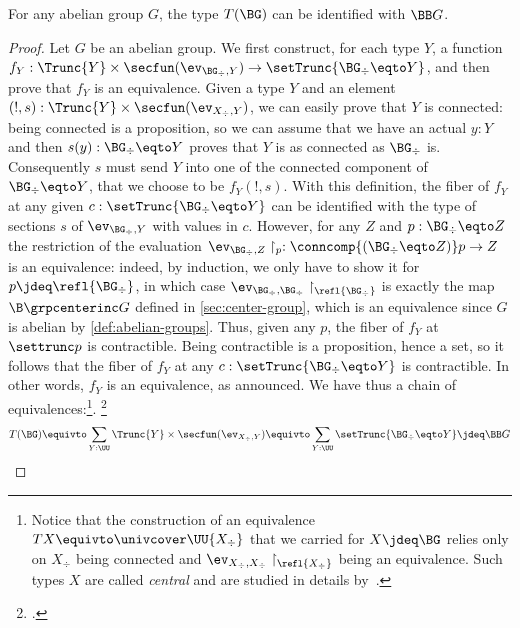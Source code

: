 \begin{lemma}\label{lem:warn-abelian-group}
  For any abelian group $G$, the type $T(\BG)$ can be identified with
  $\BB G$.
\end{lemma}
\begin{proof}
  Let $G$ be an abelian group. We first construct, for each type
  $Y$, a function
  $f_Y : \Trunc{Y} \times \secfun(\ev_{\BG_\div,Y}) \to
  \setTrunc{\BG_\div \eqto Y}$, and then prove that $f_Y$ is an
  equivalence. Given a type $Y$ and an element
  $(!,s) : \Trunc{Y} \times \secfun(\ev_{X_\div,Y})$, we can easily
  prove that $Y$ is connected: being connected is a proposition, so
  we can assume that we have an actual $y:Y$ and then
  $s(y) : \BG_\div \eqto Y$ proves that $Y$ is as connected as
  $\BG_\div$ is. Consequently $s$ must send $Y$ into one of the
  connected component of $\BG_\div \eqto Y$, that we choose to be
  $f_Y(!,s)$. With this definition, the fiber of $f_Y$ at any given
  $c : \setTrunc{\BG_\div \eqto Y}$ can be identified with the type
  of sections $s$ of $\ev_{\BG_\div,Y}$ with values in $c$. However,
  for any $Z$ and $p: \BG_\div \eqto Z$ the restriction of the
  evaluation
  $\ev_{\BG_\div,Z}\restriction_p : \conncomp{(\BG_\div \eqto Z)} p
  \to Z$ is an equivalence: indeed, by induction, we only have to
  show it for $p\jdeq \refl {\BG_\div}$, in which case
  $\ev_{\BG_\div,\BG_\div}\restriction_{\refl {\BG_\div}}$ is
  exactly the map $\B\grpcenterinc G$ defined in
  \cref{sec:center-group}, which is an equivalence since $G$ is
  abelian by \cref{def:abelian-groups}. Thus, given any $p$, the
  fiber of $f_Y$ at $\settrunc p$ is contractible. Being
  contractible is a proposition, hence a set, so it follows that the
  fiber of $f_Y$ at any $c:\setTrunc{\BG_\div \eqto Y}$ is
  contractible. In other words, $f_Y$ is an equivalence, as
  announced. We have thus a chain of equivalences:\footnote{Notice
    that the construction of an equivalence
    $TX \equivto \univcover \UU {X_\div}$ that we carried for
    $X\jdeq\BG$ relies only on $X_\div$ being connected and
    $\ev_{X_\div,X_\div}\restriction_{\refl {X_\div}}$ being an
    equivalence. Such types $X$ are called \emph{central} and are
    studied in details by~\citeauthor{BCFR}\footnotemark{}.}.%
  \footcitetext{BCFR}
  \begin{displaymath}
    T(\BG) \equivto \sum_{Y : \UU} \Trunc{Y} \times \secfun(\ev_{X_\div,Y})
    \equivto \sum_{Y : \UU} \setTrunc{\BG_\div \eqto Y} \jdeq \BB G
  \end{displaymath}
\end{proof}

